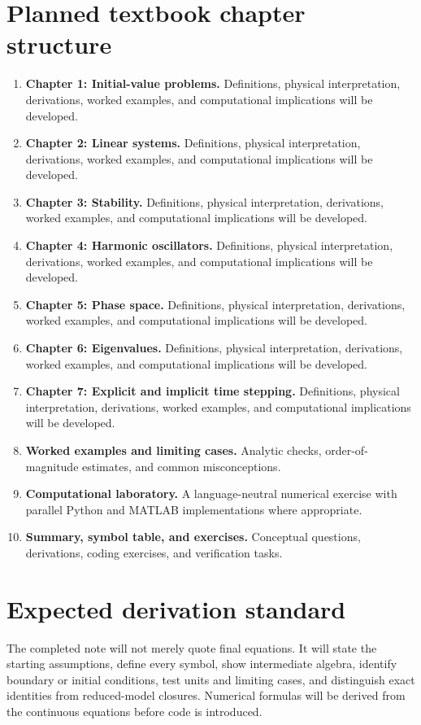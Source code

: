 \documentclass[11pt]{article}
\begin{document}
\section{Planned textbook chapter structure}
\begin{enumerate}[leftmargin=1.8em]
\item \textbf{Chapter 1: Initial-value problems.} Definitions, physical interpretation, derivations, worked examples, and computational implications will be developed.
\item \textbf{Chapter 2: Linear systems.} Definitions, physical interpretation, derivations, worked examples, and computational implications will be developed.
\item \textbf{Chapter 3: Stability.} Definitions, physical interpretation, derivations, worked examples, and computational implications will be developed.
\item \textbf{Chapter 4: Harmonic oscillators.} Definitions, physical interpretation, derivations, worked examples, and computational implications will be developed.
\item \textbf{Chapter 5: Phase space.} Definitions, physical interpretation, derivations, worked examples, and computational implications will be developed.
\item \textbf{Chapter 6: Eigenvalues.} Definitions, physical interpretation, derivations, worked examples, and computational implications will be developed.
\item \textbf{Chapter 7: Explicit and implicit time stepping.} Definitions, physical interpretation, derivations, worked examples, and computational implications will be developed.
\item \textbf{Worked examples and limiting cases.} Analytic checks, order-of-magnitude estimates, and common misconceptions.
\item \textbf{Computational laboratory.} A language-neutral numerical exercise with parallel Python and MATLAB implementations where appropriate.
\item \textbf{Summary, symbol table, and exercises.} Conceptual questions, derivations, coding exercises, and verification tasks.
\end{enumerate}

\section{Expected derivation standard}
The completed note will not merely quote final equations. It will state the starting assumptions, define every symbol, show intermediate algebra, identify boundary or initial conditions, test units and limiting cases, and distinguish exact identities from reduced-model closures. Numerical formulas will be derived from the continuous equations before code is introduced.
\end{document}
